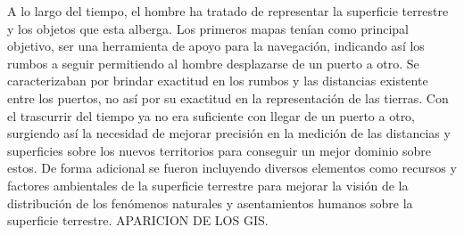 A lo largo del tiempo, el hombre ha tratado de representar la superficie terrestre y los objetos que esta alberga.
Los primeros mapas tenían como principal objetivo, ser una herramienta de apoyo para la navegación, indicando así
los rumbos a seguir permitiendo al hombre desplazarse de un puerto a otro. Se caracterizaban por brindar exactitud
en los rumbos y las distancias existente entre los puertos, no así por su exactitud en la representación de las
tierras. Con el trascurrir del tiempo ya no era suficiente con llegar de un puerto a otro, surgiendo así la
necesidad de mejorar precisión en la medición de las distancias y superficies sobre los nuevos territorios para
conseguir un mejor dominio sobre estos. De forma adicional se fueron incluyendo diversos elementos como recursos y
factores ambientales de la superficie terrestre para mejorar la visión de la distribución de los fenómenos
naturales y asentamientos humanos sobre la superficie terrestre.
APARICION DE LOS GIS.
